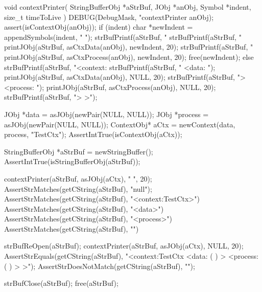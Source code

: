 \startCCode
void contextPrinter(
  StringBufferObj *aStrBuf,
  JObj            *anObj,
  Symbol          *indent,
  size_t           timeToLive
) {
  DEBUG(DebugMask, "contextPrinter %
  anObj);
  assert(isContextObj(anObj));
  if (indent) {
    char *newIndent = appendSymbols(indent, "    ");
    strBufPrintf(aStrBuf, "%
    strBufPrintf(aStrBuf, "%
    printJObj(aStrBuf, asCtxData(anObj), newIndent, 20);
    strBufPrintf(aStrBuf, "%
    printJObj(aStrBuf, asCtxProcess(anObj), newIndent, 20);
    free(newIndent);
  } else {
    strBufPrintf(aStrBuf, "<context:%
    strBufPrintf(aStrBuf, "  <data: ");
    printJObj(aStrBuf, asCtxData(anObj), NULL, 20);
    strBufPrintf(aStrBuf, "> <process: ");
    printJObj(aStrBuf, asCtxProcess(anObj), NULL, 20);
    strBufPrintf(aStrBuf, "> >");
  }
}
\stopCCode


\startCTest
  JObj *data       = asJObj(newPair(NULL, NULL));
  JObj *process    = asJObj(newPair(NULL, NULL));
  ContextObj* aCtx = newContext(data, process, "TestCtx");
  AssertIntTrue(isContextObj(aCtx));
  
  StringBufferObj *aStrBuf = newStringBuffer();
  AssertIntTrue(isStringBufferObj(aStrBuf));
  
  contextPrinter(aStrBuf, asJObj(aCtx), "  ", 20);
  AssertStrMatches(getCString(aStrBuf), "null");
  AssertStrMatches(getCString(aStrBuf), "<context:TestCtx>")
  AssertStrMatches(getCString(aStrBuf), "<data>")
  AssertStrMatches(getCString(aStrBuf), "<process>")
  AssertStrMatches(getCString(aStrBuf), "\n")

  strBufReOpen(aStrBuf);
  contextPrinter(aStrBuf, asJObj(aCtx), NULL, 20);
  AssertStrEquals(getCString(aStrBuf), "<context:TestCtx   <data: (  )  > <process: (  )  > >");
  AssertStrDoesNotMatch(getCString(aStrBuf), "\n");
  
  strBufClose(aStrBuf);
  free(aStrBuf);
\stopCTest
\stopTestCase
\stopTestSuite